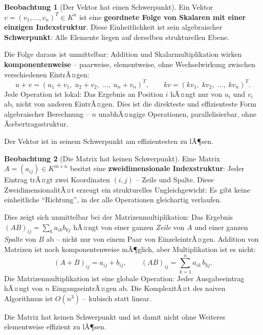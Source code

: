 ﻿\documentclass[a4paper,12pt]{report}
\theoremstyle{definition}
\newtheorem{beobachtung}{Beobachtung}
\begin{document}
\begin{beobachtung}[Der Vektor hat einen Schwerpunkt]
    Ein Vektor $v = (v_1, \dots, v_n)^T \in K^n$ ist eine \textbf{geordnete
    Folge von Skalaren mit einer einzigen Indexstruktur}. Diese Einheitlichkeit
    ist sein algebraischer \textbf{Schwerpunkt}: Alle Elemente liegen auf
    derselben strukturellen Ebene.

    Die Folge daraus ist unmittelbar: Addition und Skalarmultiplikation
    wirken \textbf{komponentenweise} -- paarweise, elementweise, ohne
    Wechselwirkung zwischen verschiedenen EintrÃ¤gen:
    \[
        u + v = (u_1 + v_1,\; u_2 + v_2,\; \dots,\; u_n + v_n)^T, \qquad
        kv = (kv_1,\; kv_2,\; \dots,\; kv_n)^T.
    \]
    Jede Operation ist lokal: Das Ergebnis an Position $i$ hÃ¤ngt nur von
    $u_i$ und $v_i$ ab, nicht von anderen EintrÃ¤gen. Dies ist die
    direkteste und effizienteste Form algebraischer Berechnung --
    $n$ unabhÃ¤ngige Operationen, parallelisierbar, ohne Ãœbertragsstruktur.

    Der Vektor ist in seinem Schwerpunkt am effizientesten zu lÃ¶sen.
\end{beobachtung}

\begin{beobachtung}[Die Matrix hat keinen Schwerpunkt]
    Eine Matrix $A = (a_{ij}) \in K^{m \times n}$ besitzt eine
    \textbf{zweidimensionale Indexstruktur}: Jeder Eintrag trÃ¤gt zwei
    Koordinaten $(i, j)$ -- Zeile und Spalte. Diese ZweidimensionalitÃ¤t
    erzeugt ein strukturelles Ungleichgewicht: Es gibt keine einheitliche
    ``Richtung'', in der alle Operationen gleichartig verlaufen.

    Dies zeigt sich unmittelbar bei der Matrizenmultiplikation: Das
    Ergebnis $(AB)_{ij} = \sum_k a_{ik} b_{kj}$ hÃ¤ngt von einer ganzen
    \emph{Zeile} von $A$ und einer ganzen \emph{Spalte} von $B$ ab --
    nicht nur von einem Paar von EinzeleintrÃ¤gen. Addition von Matrizen
    ist noch komponentenweise mÃ¶glich, aber Multiplikation ist es nicht:
    \[
        (A + B)_{ij} = a_{ij} + b_{ij}, \qquad
        (AB)_{ij} = \sum_{k=1}^{n} a_{ik}\, b_{kj}.
    \]
    Die Matrizenmultiplikation ist eine globale Operation: Jeder
    Ausgabeeintrag hÃ¤ngt von $n$ EingangseintrÃ¤gen ab. Die KomplexitÃ¤t
    des naiven Algorithmus ist $O(n^3)$ -- kubisch statt linear.

    Die Matrix hat keinen Schwerpunkt und ist damit nicht ohne Weiteres
    elementweise effizient zu lÃ¶sen.
\end{beobachtung}
\end{document}
